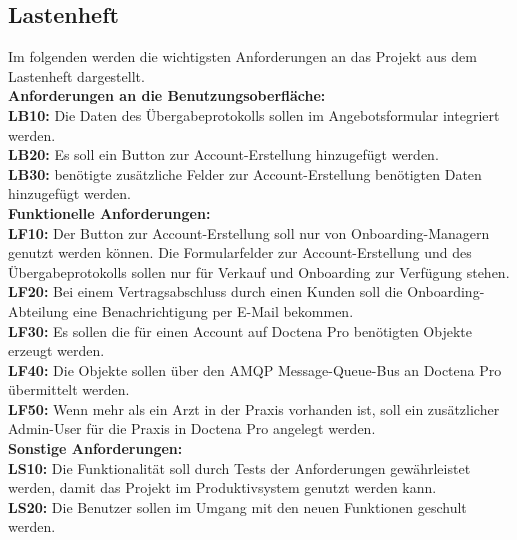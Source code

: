 \subsection{Lastenheft}
\label{sec:Lastenheft}
Im folgenden werden die wichtigsten Anforderungen an das Projekt aus dem Lastenheft dargestellt.\\[1.5ex]
\textbf{Anforderungen an die Benutzungsoberfläche:}\\[1.5ex]
\textbf{LB10:} Die Daten des Übergabeprotokolls sollen im Angebotsformular integriert  werden.\\
\textbf{LB20:} Es soll ein Button zur Account-Erstellung hinzugefügt werden.\\
\textbf{LB30:} benötigte zusätzliche Felder zur Account-Erstellung benötigten Daten hinzugefügt werden.\\[1.5ex]
\textbf{Funktionelle Anforderungen:}\\[1.5ex]
\textbf{LF10:} Der Button zur Account-Erstellung soll nur von Onboarding-Managern genutzt werden können. Die Formularfelder zur Account-Erstellung und des Übergabeprotokolls sollen nur für Verkauf und Onboarding zur Verfügung stehen.\\
\textbf{LF20:} Bei einem Vertragsabschluss durch einen Kunden soll die Onboarding-Abteilung eine Benachrichtigung per E-Mail bekommen.\\
\textbf{LF30:} Es sollen die für einen Account auf Doctena Pro benötigten Objekte erzeugt werden.\\
\textbf{LF40:} Die Objekte sollen über den AMQP Message-Queue-Bus an Doctena Pro übermittelt werden.\\
\textbf{LF50:} Wenn mehr als ein Arzt in der Praxis vorhanden ist, soll ein zusätzlicher Admin-User für die Praxis in Doctena Pro angelegt werden.\\[1.5ex]
\textbf{Sonstige Anforderungen:}\\[1.5ex]
\textbf{LS10:} Die Funktionalität soll durch Tests der Anforderungen gewährleistet werden, damit das Projekt im Produktivsystem genutzt werden kann.\\
\textbf{LS20:} Die Benutzer sollen im Umgang mit den neuen Funktionen geschult werden.



